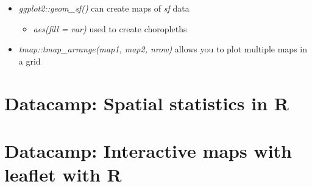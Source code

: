 \documentclass{article}
\begin{document}
\begin{itemize}
\begin{itemize}
    \end{itemize}
    \item \textit{ggplot2::geom\_sf()} can create maps of \textit{sf} data
    \begin{itemize}
        \item \textit{aes(fill = var)} used to create choropleths
    \end{itemize}
    \item \textit{tmap::tmap\_arrange(map1, map2, nrow)} allows you to plot multiple maps in a grid
\end{itemize}

\section{Datacamp: Spatial statistics in R}







\section{Datacamp: Interactive maps with leaflet with R}
\end{document}

